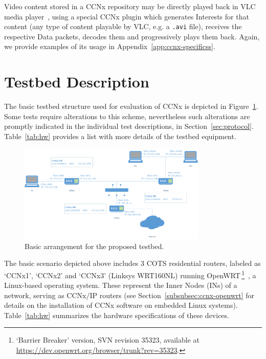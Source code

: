 Video content stored in a CCNx repository may be directly played back in 
VLC media player~\cite{website:vlc}, using a special CCNx plugin which 
generates Interests for that content (any type of content playable by VLC, 
e.g. a \verb+.avi+ file), receives the respective Data packets, decodes them 
and progressively plays them back. Again, we provide examples of its 
usage in Appendix~\ref{app:ccnx-specificss}.

\section{Testbed Description}
\label{sec:testbed}

The basic testbed structure used for evaluation of CCNx is depicted in 
Figure~\ref{fig:basic-testbed}. Some tests require alterations to this scheme, 
nevertheless such alterations are promptly indicated 
in the individual test descriptions, in Section~\ref{sec:protocol}. Table~\ref{tab:hw} 
provides a list with more details of the testbed equipment.\vertbreak

\begin{figure}[h!]

    \centering
    \includegraphics[width=0.80\textwidth]{figures/diag1.png}
    \cprotect\caption{Basic arrangement for the proposed testbed.}
    \label{fig:basic-testbed}

\end{figure}

The basic scenario depicted above includes 3 COTS residential routers, labeled 
as `CCNx1', `CCNx2' and `CCNx3' (Linksys WRT160NL) running OpenWRT\,\footnote{`Barrier 
Breaker' version, SVN revision 35323, available at \url{https://dev.openwrt.org/browser/trunk?rev=35323}.}~\cite{website:openwrt}, a Linux-based 
operating system. These represent the Inner Nodes (INs) of a network, 
serving as CCNx\slash IP routers (see Section~\ref{subsubsec:ccnx-openwrt} for details on the 
installation of CCNx software on embedded Linux systems). Table~\ref{tab:hw} 
summarizes the hardware specifications of these devices.\vertbreak 

